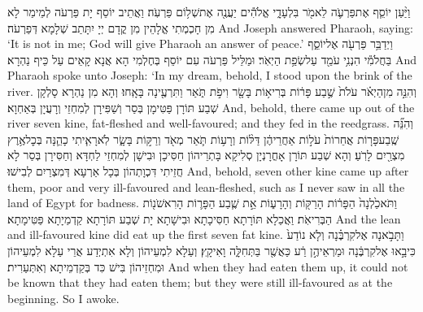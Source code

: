 {וַיַּ֨עַן יוֹסֵ֧ף אֶת\maqqaf פַּרְעֹ֛ה לֵאמֹ֖ר בִּלְעָדָ֑י אֱלֹהִ֕ים יַעֲנֶ֖ה אֶת\maqqaf שְׁל֥וֹם פַּרְעֹֽה׃}
{וַאֲתֵיב יוֹסֵף יָת פַּרְעֹה לְמֵימַר לָא מִן חָכְמְתִי אֱלָהֵין מִן קֳדָם יְיָ יִתָּתַב שְׁלָמָא דְּפַרְעֹה׃}
{And Joseph answered Pharaoh, saying: ‘It is not in me; God will give Pharaoh an answer of peace.’}{}
{וַיְדַבֵּ֥ר פַּרְעֹ֖ה אֶל\maqqaf יוֹסֵ֑ף בַּחֲלֹמִ֕י הִנְנִ֥י עֹמֵ֖ד עַל\maqqaf שְׂפַ֥ת הַיְאֹֽר׃}
{וּמַלֵּיל פַּרְעֹה עִם יוֹסֵף בְּחֶלְמִי הָא אֲנָא קָאֵים עַל כֵּיף נַהְרָא׃}
{And Pharaoh spoke unto Joseph: ‘In my dream, behold, I stood upon the brink of the river.}{}
{וְהִנֵּ֣ה מִן\maqqaf הַיְאֹ֗ר עֹלֹת֙ שֶׁ֣בַע פָּר֔וֹת בְּרִיא֥וֹת בָּשָׂ֖ר וִיפֹ֣ת תֹּ֑אַר וַתִּרְעֶ֖ינָה בָּאָֽחוּ׃}
{וְהָא מִן נַהְרָא סָלְקָן שְׁבַע תּוֹרָן פַּטִּימָן בְּסַר וְשַׁפִּירָן לְמִחְזֵי וְרָעֲיָן בְּאַחְוָא׃}
{And, behold, there came up out of the river seven kine, fat-fleshed and well-favoured; and they fed in the reedgrass.}{}
{וְהִנֵּ֞ה שֶֽׁבַע\maqqaf פָּר֤וֹת אֲחֵרוֹת֙ עֹל֣וֹת אַחֲרֵיהֶ֔ן דַּלּ֨וֹת וְרָע֥וֹת תֹּ֛אַר מְאֹ֖ד וְרַקּ֣וֹת בָּשָׂ֑ר לֹֽא\maqqaf רָאִ֧יתִי כָהֵ֛נָּה בְּכׇל\maqqaf אֶ֥רֶץ מִצְרַ֖יִם לָרֹֽעַ׃}
{וְהָא שְׁבַע תּוֹרָן אָחֳרָנְיָן סְלִיקָא בָּתְרֵיהוֹן חַסִּיכָן וּבִישָׁן לְמִחְזֵי לַחְדָּא וְחַסִּירָן בְּסַר לָא חֲזֵיתִי דִּכְוָתְהוֹן בְּכָל אַרְעָא דְּמִצְרַיִם לְבִישׁוּ׃}
{And, behold, seven other kine came up after them, poor and very ill-favoured and lean-fleshed, such as I never saw in all the land of Egypt for badness.}{}
{וַתֹּאכַ֙לְנָה֙ הַפָּר֔וֹת הָרַקּ֖וֹת וְהָרָע֑וֹת אֵ֣ת שֶׁ֧בַע הַפָּר֛וֹת הָרִאשֹׁנ֖וֹת הַבְּרִיאֹֽת׃}
{וַאֲכַלָא תּוֹרָתָא חַסִּיכָתָא וּבִישָׁתָא יָת שְׁבַע תּוֹרָתָא קַדְמַיָתָא פַּטִּימָתָא׃}
{And the lean and ill-favoured kine did eat up the first seven fat kine.}{}
{וַתָּבֹ֣אנָה אֶל\maqqaf קִרְבֶּ֗נָה וְלֹ֤א נוֹדַע֙ כִּי\maqqaf בָ֣אוּ אֶל\maqqaf קִרְבֶּ֔נָה וּמַרְאֵיהֶ֣ן רַ֔ע כַּאֲשֶׁ֖ר בַּתְּחִלָּ֑ה וָאִיקָֽץ׃}
{וְעַלָא לִמְעֵיהוֹן וְלָא אִתְיְדַע אֲרֵי עַלָא לִמְעֵיהוֹן וּמִחְזֵיהוֹן בִּישׁ כִּד בְּקַדְמֵיתָא וְאִתְּעַרִית׃}
{And when they had eaten them up, it could not be known that they had eaten them; but they were still ill-favoured as at the beginning. So I awoke.}{}
